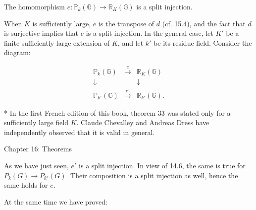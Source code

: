 The homomorphism $e: \mathbb{P}_k(\mathbb{G}) \to \mathbb{R}_K(\mathbb{G})$ is a split injection.

When $K$ is sufficiently large, $e$ is the transpose of $d$ (cf. 15.4), and the fact that $d$ is surjective implies that $e$ is a split injection. In the general case, let $K'$ be a finite sufficiently large extension of $K$, and let $k'$ be its residue field. Consider the diagram:

$$\begin{array}{ccc}
\mathbb{P}_k(\mathbb{G}) & \xrightarrow{e} & \mathbb{R}_K(\mathbb{G}) \\
\downarrow & & \downarrow \\
\mathbb{P}_{k'}(\mathbb{G}) & \xrightarrow{e'} & \mathbb{R}_{k'}(\mathbb{G}).
\end{array}$$

* In the first French edition of this book, theorem 33 was stated only for a sufficiently large field $K$. Claude Chevalley and Andreas Dress have independently observed that it is valid in general.

Chapter 16: Theorems

As we have just seen, $e'$ is a split injection. In view of 14.6, the same is true for $P_k(G) \rightarrow P_{k'}(G)$. Their composition is a split injection as well, hence the same holds for $e$.

At the same time we have proved:
